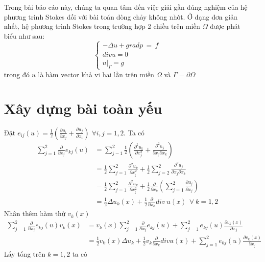 \documentclass[14pt]{extreport}
\begin{document}
{\normalsize
Trong bài báo cáo này, chúng ta quan tâm đến việc giải gần đúng nghiệm của hệ phương trình Stokes đối với bài toán dòng chảy không nhớt. Ở dạng đơn giản nhất, hệ phương trình Stokes trong trường hợp 2 chiều trên miền $\Omega$ được phát biểu như sau:
$$
\begin{cases}
-\Delta u + grad p \ = \ f \\
div u = 0 \\
u|_{\Gamma} = g
\end{cases}
$$
trong đó $u$ là hàm vector khả vi hai lần trên miền $\Omega$ và $\Gamma = \partial \Omega$
\section{Xây dựng bài toàn yếu}
Đặt $e_{ij}(u) =  \frac{1}{2} ( \frac{\partial u_i}{\partial x_j} + \frac{\partial u_j}{\partial x_i})$ $\forall i,j = 1,2$. Ta có
\begin{equation} \label{eq1}
\begin{split}
\sum_{j=1}^{2} \frac{\partial}{\partial x_j} e_{kj}(u) & = \sum_{j-1}^2 \frac{1}{2} \left(\frac{\partial^2 u_k}{\partial x_j^2} + \frac{\partial^2 u_j}{\partial x_j \partial x_k}\right) \\
 & = \frac{1}{2} \sum_{j=1}^2 \frac{\partial^2 u_k}{\partial x_j^2} + \frac{1}{2} \sum_{j=2}^2 \frac{\partial^2 u_j}{\partial x_j \partial x_k} \\
 & = \frac{1}{2} \sum_{j=1}^2 \frac{\partial^2 u_k}{\partial x_j^2} + \frac{1}{2} \frac{\partial}{\partial x_k} \left(\sum_{j=1}^2 \frac{\partial u_j}{\partial x_j} \right) \\
 & = \frac{1}{2} \Delta u_k(x) + \frac{1}{2} \frac{\partial}{\partial x_k} div \ u(x) \ \ \forall \ k = 1,2
\end{split}
\end{equation}
Nhân thêm hàm thử $v_k(x)$
\begin{equation} \label{eq2}
\begin{split}
\sum_{j=1}^{2} \frac{\partial}{\partial x_j} e_{kj}(u) v_k(x) & = v_k(x) \sum_{j=1}^2 \frac{\partial}{\partial x_j} e_{kj} (u) + \sum_{j=1}^2 e_{kj}(u) \frac{\partial v_k(x)}{\partial x_j} \\
 & = \frac{1}{2} v_k(x) \Delta u_k + \frac{1}{2} v_k \frac{\partial}{\partial x_k} div u(x) + \sum_{j=1}^2 e_{kj}(u) \frac{\partial v_k(x)}{\partial x_j}
\end{split}
\end{equation}
Lấy tổng trên $k = 1,2$ ta có
\begin{equation} \label{eq3}

\end{equation}}
\end{document}
